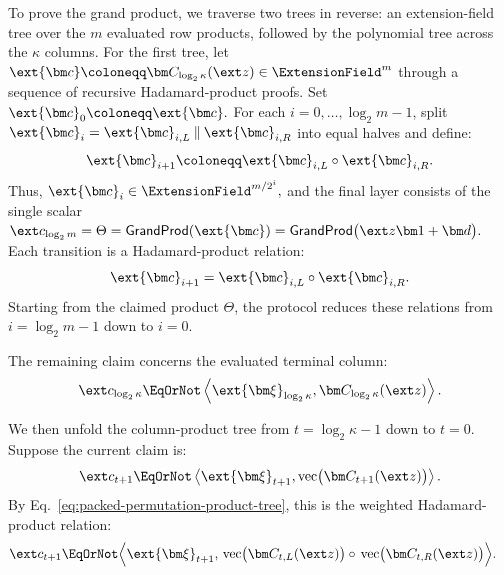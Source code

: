 To prove the grand product, we traverse two trees in reverse:
an extension-field tree over the \(m\) evaluated row products,
followed by the polynomial tree across the \(\kappa\) columns.
For the first tree, let
\(
    \ext{\bm c}
    \coloneqq
    \bm C_{\log_2\kappa}(\ext z)
    \in\ExtensionField^m
\)
through a sequence of recursive Hadamard-product proofs. Set
\(
    \ext{\bm c}_0
    \coloneqq
    \ext{\bm c}.
\)
For each \(i=0,\ldots,\log_2m-1\), split
\(
    \ext{\bm c}_i
    =
    \ext{\bm c}_{i,L}
    \mathbin{\|}
    \ext{\bm c}_{i,R}
\)
into equal halves and define:
\begin{equation*}
    \ext{\bm c}_{i+1}
    \coloneqq
    \ext{\bm c}_{i,L}
    \circ
    \ext{\bm c}_{i,R}.
\end{equation*}
Thus,
\(
    \ext{\bm c}_i
    \in
    \ExtensionField^{m/2^i},
\)
and the final layer consists of the single scalar
\(
    \ext c_{\log_2m}
    =
    \Theta
    =
    \mathsf{GrandProd}(\ext{\bm c})
    =
    \mathsf{GrandProd}
    \bigl(\ext z\bm 1+\bm d\bigr).
\)
Each transition is a Hadamard-product relation:
\[
    \ext{\bm c}_{i+1}
    =
    \ext{\bm c}_{i,L}
    \circ
    \ext{\bm c}_{i,R}.
\]
Starting from the claimed product \(\Theta\), the protocol
reduces these relations from \(i=\log_2m-1\) down to \(i=0\).

The remaining claim concerns the evaluated terminal column:
\begin{equation*}
    \ext c_{\log_2 \kappa}
    \EqOrNot
    \left\langle
        \ext{\bm\xi}_{\log_2 \kappa},
        \bm C_{\log_2 \kappa}(\ext z)
    \right\rangle.
\end{equation*}

We then unfold the column-product tree from
\(t=\log_2\kappa-1\) down to \(t=0\). Suppose the current
claim is:
\begin{equation*}
    \ext c_{t+1}
    \EqOrNot
    \left\langle
        \ext{\bm\xi}_{t+1},
        \operatorname{vec}
        \bigl(\bm C_{t+1}(\ext z)\bigr)
    \right\rangle.
\end{equation*}
By Eq.~\eqref{eq:packed-permutation-product-tree}, this is the
weighted Hadamard-product relation:
\begin{equation}
\begin{aligned}
    \ext c_{t+1}
    \EqOrNot
    \Bigl\langle
        \ext{\bm\xi}_{t+1},\,
        &\operatorname{vec}
        \bigl(\bm C_{t,L}(\ext z)\bigr)
        \circ\,
        \operatorname{vec}
        \bigl(\bm C_{t,R}(\ext z)\bigr)
    \Bigr\rangle.
\end{aligned}
\label{eq:packed-permutation-hadamard-claim}
\end{equation}

